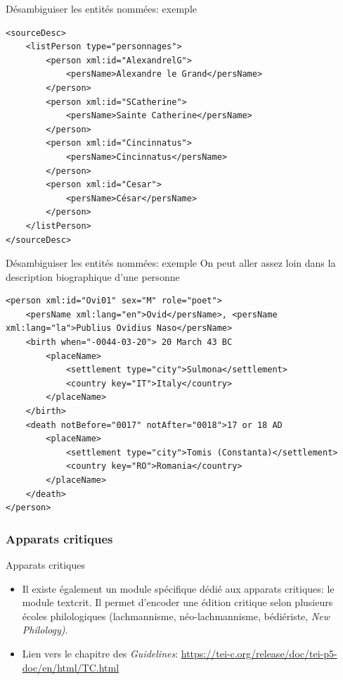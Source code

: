 \documentclass[11pt,aspectratio=1610]{beamer}
\begin{document}
\begin{frame}[containsverbatim]{Désambiguiser les entités nommées: exemple}
\begin{verbatim}
<sourceDesc>
    <listPerson type="personnages">
        <person xml:id="AlexandrelG">
            <persName>Alexandre le Grand</persName>
        </person>
        <person xml:id="SCatherine">
            <persName>Sainte Catherine</persName>
        </person>
        <person xml:id="Cincinnatus">
            <persName>Cincinnatus</persName>
        </person>
        <person xml:id="Cesar">
            <persName>César</persName>
        </person>
    </listPerson>
</sourceDesc>
\end{verbatim}
\end{frame}



\begin{frame}[containsverbatim]{Désambiguiser les entités nommées: exemple}
On peut aller assez loin dans la description biographique d'une personne%
\begin{verbatim}
<person xml:id="Ovi01" sex="M" role="poet">
    <persName xml:lang="en">Ovid</persName>, <persName xml:lang="la">Publius Ovidius Naso</persName>
    <birth when="-0044-03-20"> 20 March 43 BC 
        <placeName>
            <settlement type="city">Sulmona</settlement>
            <country key="IT">Italy</country>
        </placeName>
    </birth>
    <death notBefore="0017" notAfter="0018">17 or 18 AD 
        <placeName>
            <settlement type="city">Tomis (Constanta)</settlement>
            <country key="RO">Romania</country>
        </placeName>
    </death>
</person>
\end{verbatim}
\end{frame}



\subsubsection{Apparats critiques}
\begin{frame}{Apparats critiques}
\begin{itemize}
\item Il existe également un module spécifique dédié aux apparats critiques: le module textcrit. Il permet d'encoder une édition critique selon plusieurs écoles philologiques (lachmannisme, néo-lachmannisme, bédiériste, \textit{New Philology)}. 
\item Lien vers le chapitre des \textit{Guidelines}: \href{https://tei-c.org/release/doc/tei-p5-doc/en/html/TC.html}{https://tei-c.org/release/doc/tei-p5-doc/en/html/TC.html}
\end{itemize}
\end{frame}
\end{document}
